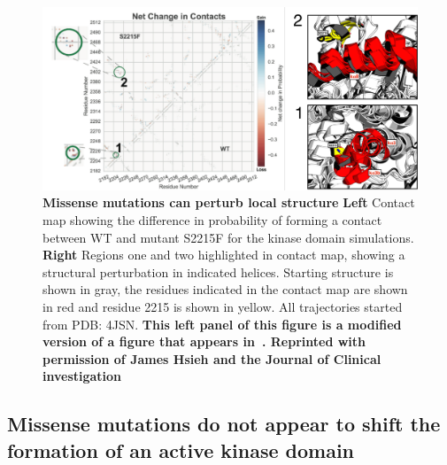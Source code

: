 \documentclass[phd,tocprelim]{cornell}
\begin{document}
\begin{landscape}
	\begin{figure}[p]
		\centering
		\includegraphics[width=1.0\linewidth]{figures/mtor-fig4.pdf}
		\caption[Missense mutations can perturb local structure]{
			{\bf Missense mutations can perturb local structure}
			{\bf Left} Contact map showing the difference in probability of forming a contact between WT and mutant S2215F for the kinase domain simulations. {\bf Right} Regions one and two highlighted in contact map, showing a structural perturbation in indicated helices. Starting structure is shown in gray, the residues indicated in the contact map are shown in red and residue 2215 is shown in yellow. All trajectories started from PDB: 4JSN. \bf{This left panel of this figure is a modified version of a figure that appears in~\citep{Xu:2016fw}. Reprinted with permission of James Hsieh and the Journal of Clinical investigation}
		}
		\label{fig:mtor-figure4}
	\end{figure}
\end{landscape}

\subsection{Missense mutations do not appear to shift the formation of an active kinase domain}
\end{document}
